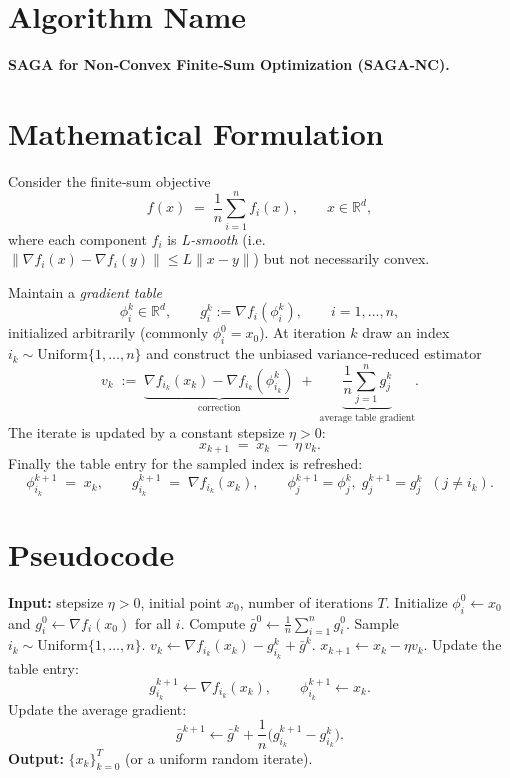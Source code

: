 \documentclass{article}
\newcommand{\R}{\mathbb{R}}
\begin{document}
\section*{Algorithm Name}
\textbf{SAGA for Non‑Convex Finite‑Sum Optimization (SAGA‑NC).}

\section*{Mathematical Formulation}
Consider the finite‑sum objective  
\[
f(x)\;=\;\frac1n\sum_{i=1}^{n}f_i(x),\qquad x\in\R^{d},
\]
where each component $f_i$ is \emph{L‑smooth} (i.e. $\|\nabla f_i(x)-\nabla f_i(y)\|\le L\|x-y\|$) but not necessarily convex.  

Maintain a \emph{gradient table} 
\[
\phi_i^k\in\R^{d},\qquad g_i^k:=\nabla f_i(\phi_i^k),\qquad i=1,\dots,n,
\]
initialized arbitrarily (commonly $\phi_i^0=x_0$).  
At iteration $k$ draw an index $i_k\sim\text{Uniform}\{1,\dots,n\}$ and construct the unbiased variance‑reduced estimator
\[
v_k\;:=\;\underbrace{\nabla f_{i_k}(x_k)-\nabla f_{i_k}(\phi_{i_k}^k)}_{\text{correction}}
\;+\;\underbrace{\frac1n\sum_{j=1}^{n}g_j^k}_{\text{average table gradient}}.
\tag{1}
\]
The iterate is updated by a constant stepsize $\eta>0$:
\[
x_{k+1}\;=\;x_k\;-\;\eta\,v_k. \tag{2}
\]
Finally the table entry for the sampled index is refreshed:
\[
\phi_{i_k}^{k+1}\;=\;x_k,\qquad 
g_{i_k}^{k+1}\;=\;\nabla f_{i_k}(x_k), \qquad 
\phi_{j}^{k+1}= \phi_{j}^{k},\; g_{j}^{k+1}=g_{j}^{k}\;\;(j\neq i_k). \tag{3}
\]

\section*{Pseudocode}
\begin{algorithm}[H]
\caption{SAGA for Non‑Convex Finite‑Sum}
\begin{algorithmic}[1]
\STATE \textbf{Input:} stepsize $\eta>0$, initial point $x_0$, number of iterations $T$.
\STATE Initialize $\phi_i^0\leftarrow x_0$ and $g_i^0\leftarrow \nabla f_i(x_0)$ for all $i$.
\STATE Compute $\bar g^0\leftarrow \frac1n\sum_{i=1}^{n}g_i^0$.
    \STATE Sample $i_k\sim\text{Uniform}\{1,\dots,n\}$.
    \STATE $v_k\leftarrow \nabla f_{i_k}(x_k)-g_{i_k}^k+\bar g^k$.
    \STATE $x_{k+1}\leftarrow x_k-\eta v_k$.
    \STATE Update the table entry:
    \[
    g_{i_k}^{k+1}\leftarrow \nabla f_{i_k}(x_k),\qquad 
    \phi_{i_k}^{k+1}\leftarrow x_k .
    \]
    \STATE Update the average gradient:
    \[
    \bar g^{k+1}\leftarrow \bar g^{k}+ \frac{1}{n}\bigl(g_{i_k}^{k+1}-g_{i_k}^{k}\bigr).
    \]
\ENDFOR
\STATE \textbf{Output:} $\{x_k\}_{k=0}^{T}$ (or a uniform random iterate).
\end{algorithmic}
\end{algorithm}
\end{document}
